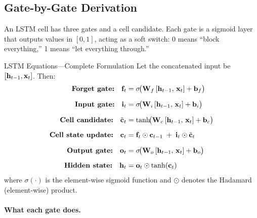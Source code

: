 \subsection{Gate-by-Gate Derivation}

An LSTM cell has three gates and a cell candidate.  Each gate is a sigmoid
layer that outputs values in $[0, 1]$, acting as a soft switch: 0 means
``block everything,'' 1 means ``let everything through.''

\begin{mathresult}{LSTM Equations---Complete Formulation}
Let the concatenated input be $[\mathbf{h}_{t-1}, \mathbf{x}_t]$.  Then:
\begin{align}
\textbf{Forget gate:} \quad
\mathbf{f}_t &= \sigma\!\bigl(\mathbf{W}_f \,[\mathbf{h}_{t-1},\, \mathbf{x}_t] + \mathbf{b}_f\bigr)
\label{eq:lstm_forget} \\[6pt]
\textbf{Input gate:} \quad
\mathbf{i}_t &= \sigma\!\bigl(\mathbf{W}_i \,[\mathbf{h}_{t-1},\, \mathbf{x}_t] + \mathbf{b}_i\bigr)
\label{eq:lstm_input} \\[6pt]
\textbf{Cell candidate:} \quad
\tilde{\mathbf{c}}_t &= \tanh\!\bigl(\mathbf{W}_c \,[\mathbf{h}_{t-1},\, \mathbf{x}_t] + \mathbf{b}_c\bigr)
\label{eq:lstm_candidate} \\[6pt]
\textbf{Cell state update:} \quad
\mathbf{c}_t &= \mathbf{f}_t \odot \mathbf{c}_{t-1}
       \;+\; \mathbf{i}_t \odot \tilde{\mathbf{c}}_t
\label{eq:lstm_cell} \\[6pt]
\textbf{Output gate:} \quad
\mathbf{o}_t &= \sigma\!\bigl(\mathbf{W}_o \,[\mathbf{h}_{t-1},\, \mathbf{x}_t] + \mathbf{b}_o\bigr)
\label{eq:lstm_output} \\[6pt]
\textbf{Hidden state:} \quad
\mathbf{h}_t &= \mathbf{o}_t \odot \tanh(\mathbf{c}_t)
\label{eq:lstm_hidden}
\end{align}
where $\sigma(\cdot)$ is the element-wise sigmoid function and $\odot$
denotes the Hadamard (element-wise) product.
\end{mathresult}

\paragraph{What each gate does.}

